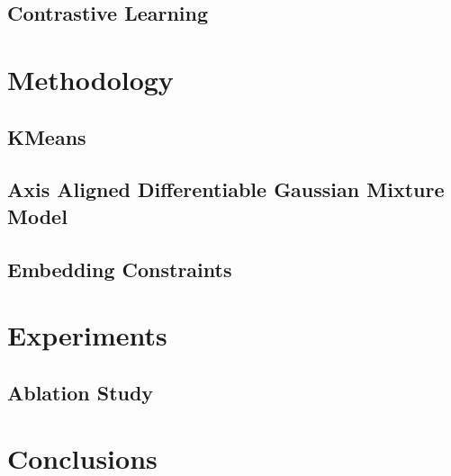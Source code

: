 \documentclass[10pt,twocolumn]{article}
\begin{document}
\subsection{Contrastive Learning}

%
%	
%		


\section{Methodology}

\subsection{KMeans}

\subsection{Axis Aligned Differentiable Gaussian Mixture Model}


\subsection{Embedding Constraints}



\section{Experiments}


\subsection{Ablation Study}



\section{Conclusions}







	
	
\end{document}
